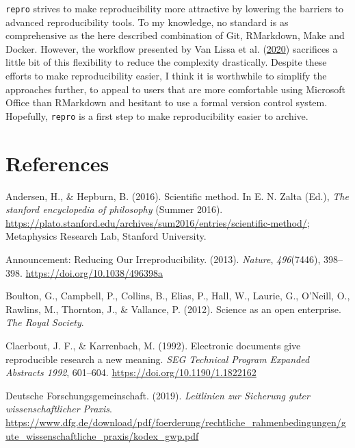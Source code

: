 \documentclass[12pt,a4paper,]{article}
\begin{document}
\texttt{repro} strives to make reproducibility more attractive by lowering the barriers to advanced reproducibility tools.
To my knowledge, no standard is as comprehensive as the here described combination of Git, RMarkdown, Make and Docker.
However, the workflow presented by Van Lissa et al. (\protect\hyperlink{ref-vanlissaWORCSWorkflowOpen2020}{2020}) sacrifices a little bit of this flexibility to reduce the complexity drastically.
Despite these efforts to make reproducibility easier, I think it is worthwhile to simplify the approaches further, to appeal to users that are more comfortable using Microsoft Office than RMarkdown and hesitant to use a formal version control system.
Hopefully, \texttt{repro} is a first step to make reproducibility easier to archive.

\hypertarget{references}{%
\section*{References}\label{references}}

\hypertarget{refs}{}
\leavevmode\hypertarget{ref-andersonScientificMethod2016}{}%
Andersen, H., \& Hepburn, B. (2016). Scientific method. In E. N. Zalta (Ed.), \emph{The stanford encyclopedia of philosophy} (Summer 2016). \url{https://plato.stanford.edu/archives/sum2016/entries/scientific-method/}; Metaphysics Research Lab, Stanford University.

\leavevmode\hypertarget{ref-AnnouncementReducingOur2013}{}%
Announcement: Reducing Our Irreproducibility. (2013). \emph{Nature}, \emph{496}(7446), 398--398. \url{https://doi.org/10.1038/496398a}

\leavevmode\hypertarget{ref-boultonScienceOpenEnterprise2012}{}%
Boulton, G., Campbell, P., Collins, B., Elias, P., Hall, W., Laurie, G., O'Neill, O., Rawlins, M., Thornton, J., \& Vallance, P. (2012). Science as an open enterprise. \emph{The Royal Society}.

\leavevmode\hypertarget{ref-claerboutElectronicDocumentsGive1992}{}%
Claerbout, J. F., \& Karrenbach, M. (1992). Electronic documents give reproducible research a new meaning. \emph{SEG Technical Program Expanded Abstracts 1992}, 601--604. \url{https://doi.org/10.1190/1.1822162}

\leavevmode\hypertarget{ref-dfg2019}{}%
Deutsche Forschungsgemeinschaft. (2019). \emph{Leitlinien zur Sicherung guter wissenschaftlicher Praxis}. \url{https://www.dfg.de/download/pdf/foerderung/rechtliche_rahmenbedingungen/gute_wissenschaftliche_praxis/kodex_gwp.pdf}
\end{document}
